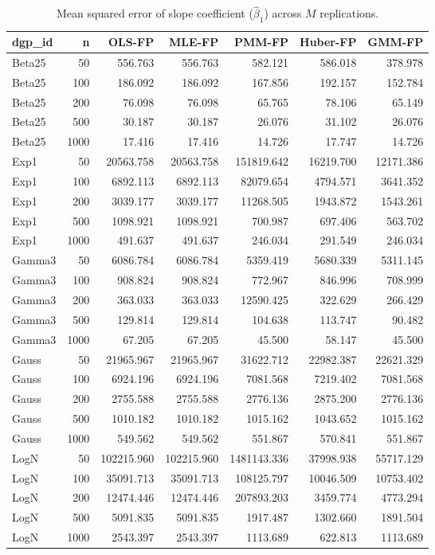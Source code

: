 \begin{table}[t]
\centering
\caption{Mean squared error of slope coefficient ($\hat\beta_1$) across $M$ replications.}
\label{tab:mc-mse}
\begin{tabular}{lrrrrrr}
\toprule
dgp_id & n & OLS-FP & MLE-FP & PMM-FP & Huber-FP & GMM-FP \\
\midrule
Beta25 & 50 & 556.763 & 556.763 & 582.121 & 586.018 & 378.978 \\
Beta25 & 100 & 186.092 & 186.092 & 167.856 & 192.157 & 152.784 \\
Beta25 & 200 & 76.098 & 76.098 & 65.765 & 78.106 & 65.149 \\
Beta25 & 500 & 30.187 & 30.187 & 26.076 & 31.102 & 26.076 \\
Beta25 & 1000 & 17.416 & 17.416 & 14.726 & 17.747 & 14.726 \\
Exp1 & 50 & 20563.758 & 20563.758 & 151819.642 & 16219.700 & 12171.386 \\
Exp1 & 100 & 6892.113 & 6892.113 & 82079.654 & 4794.571 & 3641.352 \\
Exp1 & 200 & 3039.177 & 3039.177 & 11268.505 & 1943.872 & 1543.261 \\
Exp1 & 500 & 1098.921 & 1098.921 & 700.987 & 697.406 & 563.702 \\
Exp1 & 1000 & 491.637 & 491.637 & 246.034 & 291.549 & 246.034 \\
Gamma3 & 50 & 6086.784 & 6086.784 & 5359.419 & 5680.339 & 5311.145 \\
Gamma3 & 100 & 908.824 & 908.824 & 772.967 & 846.996 & 708.999 \\
Gamma3 & 200 & 363.033 & 363.033 & 12590.425 & 322.629 & 266.429 \\
Gamma3 & 500 & 129.814 & 129.814 & 104.638 & 113.747 & 90.482 \\
Gamma3 & 1000 & 67.205 & 67.205 & 45.500 & 58.147 & 45.500 \\
Gauss & 50 & 21965.967 & 21965.967 & 31622.712 & 22982.387 & 22621.329 \\
Gauss & 100 & 6924.196 & 6924.196 & 7081.568 & 7219.402 & 7081.568 \\
Gauss & 200 & 2755.588 & 2755.588 & 2776.136 & 2875.200 & 2776.136 \\
Gauss & 500 & 1010.182 & 1010.182 & 1015.162 & 1043.652 & 1015.162 \\
Gauss & 1000 & 549.562 & 549.562 & 551.867 & 570.841 & 551.867 \\
LogN & 50 & 102215.960 & 102215.960 & 1481143.336 & 37998.938 & 55717.129 \\
LogN & 100 & 35091.713 & 35091.713 & 108125.797 & 10046.509 & 10753.402 \\
LogN & 200 & 12474.446 & 12474.446 & 207893.203 & 3459.774 & 4773.294 \\
LogN & 500 & 5091.835 & 5091.835 & 1917.487 & 1302.660 & 1891.504 \\
LogN & 1000 & 2543.397 & 2543.397 & 1113.689 & 622.813 & 1113.689 \\
\bottomrule
\end{tabular}
\end{table}

